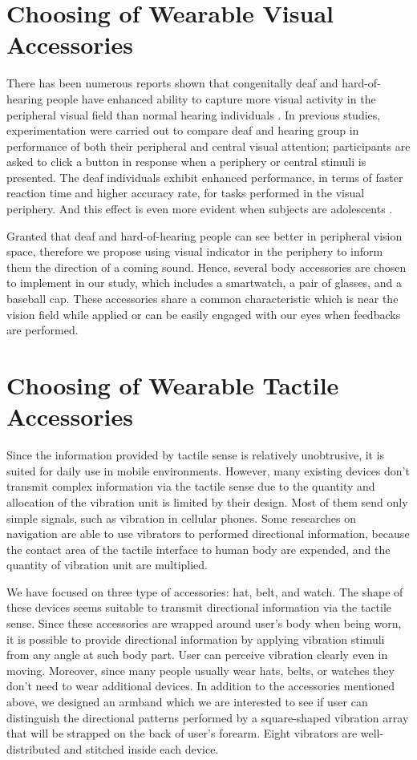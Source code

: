 \documentclass{sigchi}
\begin{document}
\section{Choosing of Wearable Visual Accessories}
There has been numerous reports shown that congenitally deaf and hard-of-hearing people have enhanced ability to capture more visual activity in the peripheral visual field than normal hearing individuals \cite{Bavelier2000,Dye2009}. In previous studies, experimentation were carried out to compare deaf and hearing group in performance of both their peripheral and central visual attention; participants are asked to click a button in response when a periphery or central stimuli is presented. The deaf individuals exhibit enhanced performance, in terms of faster reaction time and higher accuracy rate, for tasks performed in the visual periphery. And this effect is even more evident when subjects are adolescents \cite{Codina2011a,Codina2011}.

Granted that deaf and hard-of-hearing people can see better in peripheral vision space, therefore we propose using visual indicator in the periphery to inform them the direction of a coming sound. Hence, several body accessories are chosen to implement in our study, which includes a smartwatch, a pair of glasses, and a baseball cap. These accessories share a common characteristic which is near the vision field while applied or can be easily engaged with our eyes when feedbacks are performed.

\section{Choosing of Wearable Tactile Accessories}
Since the information provided by tactile sense is relatively unobtrusive, it is suited for daily use in mobile environments. However, many existing devices don't transmit complex information via the tactile sense due to the quantity and allocation of the vibration unit is limited by their design. Most of them send only simple signals, such as vibration in cellular phones. Some researches on navigation are able to use vibrators to performed directional information, because the contact area of the tactile interface to human body are expended, and the quantity of vibration unit are multiplied.

We have focused on three type of accessories: hat, belt, and watch. The shape of these devices seems suitable to transmit directional information via the tactile sense. Since these accessories are wrapped around user's body when being worn, it is possible to provide directional information by applying vibration stimuli from any angle at such body part. User can perceive vibration clearly even in moving. Moreover, since many people usually wear hats, belts, or watches they don't need to wear additional devices. In addition to the accessories mentioned above, we designed an armband which we are interested to see if user can distinguish the directional patterns performed by a square-shaped vibration array that will be strapped on the back of user's forearm. Eight vibrators are well-distributed and stitched inside each device.
\end{document}
